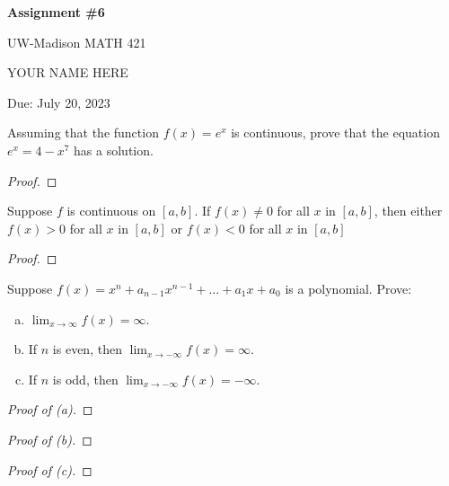 \documentclass{article} %
\theoremstyle{plain}
\theoremstyle{definition}
\begin{document}
\begin{center}
\Large{\textbf{Assignment \#6}
            
UW-Madison MATH 421} 
\vspace{5pt}
        
\normalsize{  YOUR NAME HERE
        
Due: July 20, 2023   }
\vspace{15pt}
        
\end{center}


\noindent{} Assuming that the function $f(x) = e^x$ is continuous, prove that the equation $e^x = 4-x^7$ has a solution. 

\begin{proof} 
\end{proof} 






\noindent{} Suppose $f$ is continuous on $[a,b]$. If $f(x) \neq 0$ for all $x$ in $[a,b]$, then either $f(x) > 0$ for all $x$ in $[a,b]$ or $f(x) < 0$ for all $x$ in $[a,b]$

\begin{proof} 

\end{proof} 





\noindent{} Suppose $f(x) = x^n + a_{n-1} x^{n-1} + \dots + a_1 x + a_0$ is a polynomial. Prove:
\begin{enumerate}[(a)]
\item $\lim_{x \rightarrow\infty} f(x) = \infty$.
\item If $n$ is even, then  $\lim_{x \rightarrow-\infty} f(x) = \infty$. 
\item If $n$ is odd, then  $\lim_{x \rightarrow-\infty} f(x) = -\infty$.
\end{enumerate}

\begin{proof}[Proof of (a)] 

\end{proof} 

\begin{proof}[Proof of (b)] 

\end{proof} 

\begin{proof}[Proof of (c)] 

\end{proof} 
\end{document}
